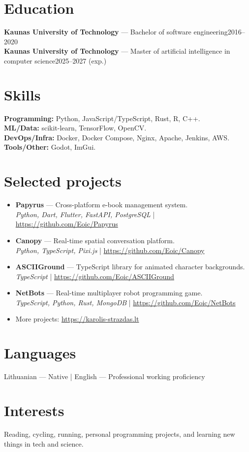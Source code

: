 \documentclass[10pt,a4paper]{article}
\newcommand{\entry}[3]{\noindent\textbf{#1} — #2\hfill #3\\}
\newcommand{\techstack}[1]{\textcolor{black!70}{\small\textit{#1}}}
\begin{document}
\section*{Education}
\entry{Kaunas University of Technology}{Bachelor of software engineering}{2016--2020}
\entry{Kaunas University of Technology}{Master of artificial intelligence in computer science}{2025--2027 (exp.)}
\vspace{-0.8em}

\section*{Skills}
\textbf{Programming:} Python, JavaScript/TypeScript, Rust, R, C++.\\
\textbf{ML/Data:} scikit-learn, TensorFlow, OpenCV.\\
\textbf{DevOps/Infra:} Docker, Docker Compose, Nginx, Apache, Jenkins, AWS.\\
\textbf{Tools/Other:} Godot, ImGui.

\section*{Selected projects}
\begin{itemize}[leftmargin=*,itemsep=0.08em,topsep=0.08em]
  \item \textbf{Papyrus} — Cross-platform e-book management system.\\
        \techstack{Python, Dart, Flutter, FastAPI, PostgreSQL} | \url{https://github.com/Eoic/Papyrus}
  \item \textbf{Canopy} — Real-time spatial conversation platform.\\
        \techstack{Python, TypeScript, Pixi.js} | \url{https://github.com/Eoic/Canopy}
  \item \textbf{ASCIIGround} — TypeScript library for animated character backgrounds.\\
        \techstack{TypeScript} | \url{https://github.com/Eoic/ASCIIGround}
  \item \textbf{NetBots} — Real-time multiplayer robot programming game.\\
        \techstack{TypeScript, Python, Rust, MongoDB} | \url{https://github.com/Eoic/NetBots}
  \item More projects: \url{https://karolis-strazdas.lt}
\end{itemize}

\section*{Languages}
Lithuanian — Native \;\;|\;\; English — Professional working proficiency

\section*{Interests}
Reading, cycling, running, personal programming projects, and learning new things in tech and science.
\end{document}
